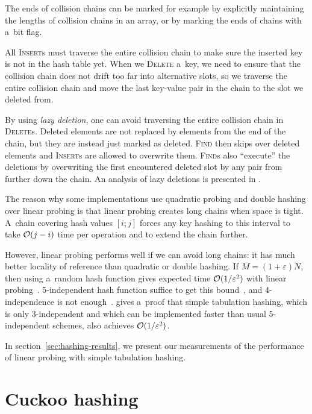 The ends of collision chains can be marked for example by explicitly maintaining
the lengths of collision chains in an array, or by marking the ends of chains
with a~bit flag.

All \textsc{Insert}s must traverse the entire collision chain to make sure
the inserted key is not in the hash table yet.
When we \textsc{Delete} a~key, we need to ensure that the collision chain
does not drift too far into alternative slots, so we traverse the entire
collision chain and move the last key-value pair in the chain to the slot
we deleted from.

By using \emph{lazy deletion}, one can avoid traversing the entire collision
chain in \textsc{Delete}s. Deleted elements are not replaced by elements from
the end of the chain, but they are instead just marked as deleted.
\textsc{Find} then skips over deleted elements and \textsc{Insert}s are allowed
to overwrite them.  \textsc{Find}s also ``execute'' the deletions by
overwriting the first encountered deleted slot by any pair from further down
the chain. An analysis of lazy deletions is presented in \cite{lazy-deletions}.

The reason why some implementations use quadratic probing and double hashing
over linear probing is that linear probing creates long chains when space is
tight. A~chain covering hash values $[i;j]$ forces any key hashing to this
interval to take $\mathcal{O}(j-i)$ time per operation and to extend the chain further.

However, linear probing performs well if we can avoid long chains: it has
much better locality of reference than quadratic or double hashing.
If $M=(1+\varepsilon) N$, then using a~random hash function gives expected
time $\mathcal{O}(1/\varepsilon^2)$ with linear probing~\cite{knuth-linear}.
5-independent hash function suffice to get this bound~\cite{linear-probing-ci},
and 4-independence is not enough~\cite{linear-probing-constant}.
\cite{power-of-simple-tab} gives a~proof that simple tabulation hashing,
which is only 3-independent and which can be implemented faster than usual
5-independent schemes, also achieves $\mathcal{O}(1/\varepsilon^2)$.

In section~\ref{sec:hashing-results}, we present our measurements of the
performance of linear probing with simple tabulation hashing.

\section{Cuckoo hashing}
\label{sec:cuckoo}

